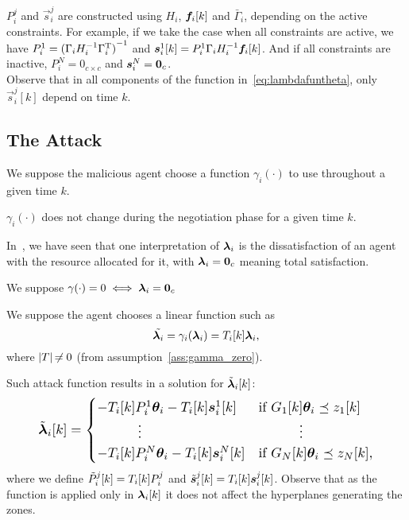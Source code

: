 \documentclass{ifacconf}  %
\begin{document}
  $P_{i}^{j}$ and $\vec{s}_{i}^{j}$ are constructed using $H_{i}$, $\fik$ and $\bar{\Gamma}_{i}$, depending on the active constraints.
  For example, if we take the case when all constraints are active, we have ${P_{i}^{1}={(\relax{\Gamma}_{i}H_{i}^{-1}\relax{\Gamma}_{i}^{\mathrm{T}})}^{-1}}$ and ${\vec{s}_{i}^{1}[k]=P_{i}^{1}\bar{\Gamma}_{i}H_{i}^{-1}\fik}$.
  And if all constraints are inactive, ${P_{i}^{N}=0_{c\times c}}$ and ${\boldsymbol{s}_{i}^{N}=\mathbf{0}_{c}}$.\\
  Observe that in all components of the function in~\eqref{eq:lambdafuntheta}, only $\vec{s}_{i}^{j}[k]$ depend on time $k$.


\subsection{The Attack}\label{ssec:attack}
We suppose the malicious agent choose a function $\gamma_{i}(\cdot)$ to use throughout a given time $k$.
\begin{assumption}
  $\gamma_{i}(\cdot)$ does not change during the negotiation phase for a given time $k$.
\end{assumption}

In~\cite{NogueiraEtAl2021}, we have seen that one interpretation of $\boldsymbol{\lambda}_i$ is the dissatisfaction of an agent with the resource allocated for it, with $\boldsymbol{\lambda}_i=\mathbf{0}_{c}$ meaning total satisfaction.
\begin{assumption}\label{ass:gamma_zero}
  We suppose $\gamma(\cdot)=0\iff\boldsymbol{\lambda}_i=\mathbf{0}_{c}$
\end{assumption}


\begin{assumption}
  We suppose the agent chooses a linear function such as \[ {\tilde{\lambdai}=\gamma_{i}(\vec{\lambda}_{i})=\Tik\vec{\lambda}_{i}}, \]
  where $|T|\not\nobreak\mkern -2mu = 0$ (from assumption~\ref{ass:gamma_zero}).
\end{assumption}

Such attack function results in a \pwa{} solution for $\tilde{\boldsymbol{\lambda}}_i[k]$:
\begin{equation}
  \resizebox{.88\columnwidth}{!}{$
    \label{eq:linear_cheating}
    \lambdaicheat[k]=
    \begin{cases}
      -\Tik P_{i}^{1}\vec{\theta}_{i}-\Tik \vec{s}_{i}^{1}[k]&\text{if}\ G_{1}[k]\thetai \preceq z_{1}[k] \\
      \qquad\quad \vdots&\qquad\quad \vdots\\
      -\Tik P_{i}^{N}\vec{\theta}_{i}-\Tik \vec{s}_{i}^{N}[k]&\text{if}\ G_{N}[k]\thetai \preceq z_{N}[k],
    \end{cases}
    $}
\end{equation}
where we define $\tilde{P}_{i}^{j}[k]=\Tik P_{i}^{j}$ and $\tilde{\vec{s}}_{i}^{j}[k]=\Tik\vec{s}_{i}^{j}[k]$.
Observe that as the function is applied only in $\lambdaik$ it does not affect the hyperplanes generating the zones.
\end{document}
